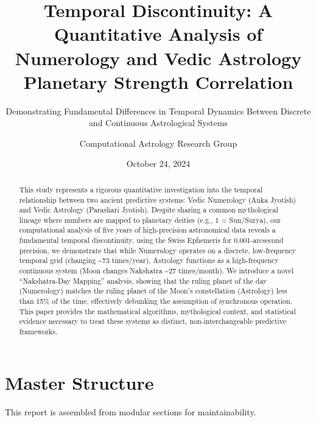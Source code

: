 \documentclass[
  american,
  11pt,
  oneside,
  openany]{article}
\title{Temporal Discontinuity: A Quantitative Analysis of Numerology and
Vedic Astrology Planetary Strength Correlation}
\subtitle{Demonstrating Fundamental Differences in Temporal Dynamics
Between Discrete and Continuous Astrological Systems}
\author{Computational Astrology Research Group}
\date{October 24, 2024}
\renewcommand*\contentsname{Table of contents}
\newcommand\contentsname{Table of contents}
\begin{document}
\maketitle
\begin{abstract}
This study represents a rigorous quantitative investigation into the
temporal relationship between two ancient predictive systems: Vedic
Numerology (Anka Jyotish) and Vedic Astrology (Parashari Jyotish).
Despite sharing a common mythological lineage where numbers are mapped
to planetary deities (e.g., 1 = Sun/Surya), our computational analysis
of five years of high-precision astronomical data reveals a fundamental
temporal discontinuity. using the Swiss Ephemeris for 0.001-arcsecond
precision, we demonstrate that while Numerology operates on a discrete,
low-frequency temporal grid (changing \textasciitilde73 times/year),
Astrology functions as a high-frequency continuous system (Moon changes
Nakshatra \textasciitilde27 times/month). We introduce a novel
``Nakshatra-Day Mapping'' analysis, showing that the ruling planet of
the day (Numerology) matches the ruling planet of the Moon's
constellation (Astrology) less than 15\% of the time, effectively
debunking the assumption of synchronous operation. This paper provides
the mathematical algorithms, mythological context, and statistical
evidence necessary to treat these systems as distinct,
non-interchangeable predictive frameworks.
\end{abstract}



\renewcommand*\contentsname{Table of contents}
{
\hypersetup{linkcolor=}
\setcounter{tocdepth}{3}
\tableofcontents
}
\listoffigures
\listoftables

\section{Master Structure}\label{master-structure}

\begin{tcolorbox}[enhanced jigsaw, bottomtitle=1mm, colbacktitle=quarto-callout-note-color!10!white, bottomrule=.15mm, opacitybacktitle=0.6, breakable, rightrule=.15mm, opacityback=0, coltitle=black, left=2mm, arc=.35mm, toptitle=1mm, leftrule=.75mm, titlerule=0mm, colback=white, colframe=quarto-callout-note-color-frame, title=\textcolor{quarto-callout-note-color}{\faInfo}\hspace{0.5em}{Note}, toprule=.15mm]

This report is assembled from modular sections for maintainability.

\end{tcolorbox}
\end{document}

